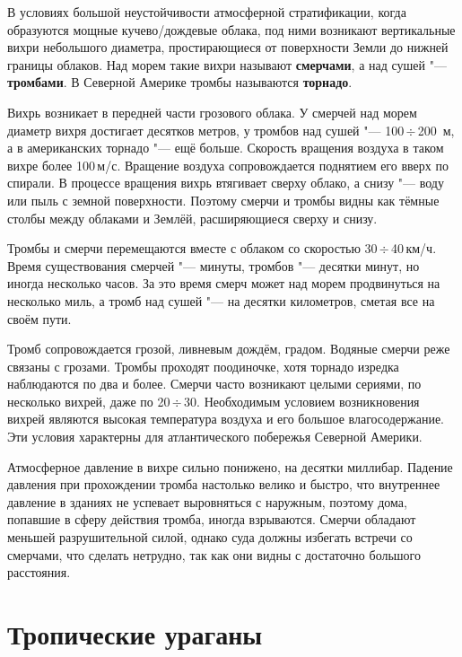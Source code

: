 \documentclass[a4paper, 12pt, twoside, draft, book, russian, fittopage, cyremdash, openright]{ncc}
\newcommand{\mps}{\,м/с\xspace}
\newcommand{\kph}{\,км/ч\xspace}
\newcommand{\otdo}{\,\ensuremath{\div}\,}
\begin{document}
В условиях большой неустойчивости атмосферной стратификации, когда
образуются мощные кучево\-/дождевые облака, под ними возникают
вертикальные вихри небольшого диаметра, простирающиеся от поверхности
Земли до нижней границы облаков. Над морем такие вихри называют
\textbf{смерчами}, а над сушей "---
\textbf{тромбами}. В Северной Америке тромбы называются
\textbf{торнадо}.

Вихрь возникает в передней части грозового облака. У смерчей над морем
диаметр вихря достигает десятков метров, у тромбов над сушей "---
100\otdo200~м, а в американских торнадо "--- ещё больше. Скорость
вращения воздуха в таком вихре более 100\mps. Вращение воздуха
сопровождается поднятием его вверх по спирали. В процессе вращения
вихрь втягивает сверху облако, а снизу "--- воду или пыль с земной
поверхности. Поэтому смерчи и тромбы видны как тёмные столбы между
облаками и Землёй, расширяющиеся сверху и снизу.

Тромбы и смерчи перемещаются вместе с облаком со скоростью
30\otdo40\kph. Время существования смерчей "--- минуты, тромбов "---
десятки минут, но иногда несколько часов. За это время смерч может над
морем продвинуться на несколько миль, а тромб над сушей "--- на десятки
километров, сметая все на своём пути.

Тромб сопровождается грозой, ливневым дождём, градом. Водяные смерчи
реже связаны с грозами. Тромбы проходят поодиночке, хотя торнадо
изредка наблюдаются по два и более. Смерчи часто возникают целыми
сериями, по несколько вихрей, даже по 20\otdo30. Необходимым условием
возникновения вихрей являются высокая температура воздуха и его
большое влагосодержание. Эти условия характерны для атлантического
побережья Северной Америки.

Атмосферное давление в вихре сильно понижено, на десятки
миллибар. Падение давления при прохождении тромба настолько велико и
быстро, что внутреннее давление в зданиях не успевает выровняться с
наружным, поэтому дома, попавшие в сферу действия тромба, иногда
взрываются. Смерчи обладают меньшей разрушительной силой, однако суда
должны избегать встречи со смерчами, что сделать нетрудно, так как они
видны с достаточно большого расстояния.

\section{Тропические ураганы}
\label{sec:hurricans}
\end{document}
